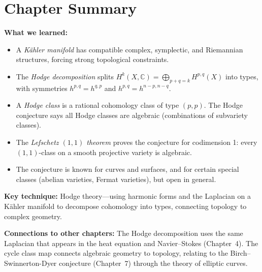 \section*{Chapter Summary}

\noindent\textbf{What we learned:}
\begin{itemize}
  \item A \emph{K\"{a}hler manifold} has compatible complex, symplectic, and Riemannian structures, forcing strong topological constraints.
  \item The \emph{Hodge decomposition} splits $H^k(X, \mathbb{C}) = \bigoplus_{p+q=k} H^{p,q}(X)$ into types, with symmetries $h^{p,q} = h^{q,p}$ and $h^{p,q} = h^{n-p,n-q}$.
  \item A \emph{Hodge class} is a rational cohomology class of type $(p,p)$. The Hodge conjecture says all Hodge classes are algebraic (combinations of subvariety classes).
  \item The \emph{Lefschetz $(1,1)$ theorem} proves the conjecture for codimension 1: every $(1,1)$-class on a smooth projective variety is algebraic.
  \item The conjecture is known for curves and surfaces, and for certain special classes (abelian varieties, Fermat varieties), but open in general.
\end{itemize}

\noindent\textbf{Key technique:} Hodge theory---using harmonic forms and the Laplacian on a K\"{a}hler manifold to decompose cohomology into types, connecting topology to complex geometry.

\noindent\textbf{Connections to other chapters:} The Hodge decomposition uses the same Laplacian that appears in the heat equation and Navier--Stokes (Chapter~4). The cycle class map connects algebraic geometry to topology, relating to the Birch--Swinnerton-Dyer conjecture (Chapter~7) through the theory of elliptic curves.
